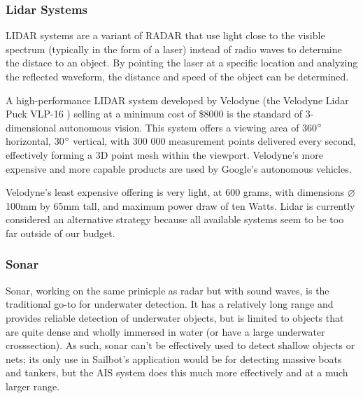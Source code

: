 \subsubsection{\label{sec:intro:alternatives:lidar}Lidar Systems}
LIDAR systems are a variant of RADAR that use light close to the visible spectrum (typically in the form of a laser) instead of radio waves to determine the distace to an object. By pointing the laser at a specific location and analyzing the reflected waveform, the distance and speed of the object can be determined. 

A high-performance LIDAR system developed by Velodyne (the Velodyne Lidar Puck VLP-16 \cite{velodyne-vlp16}) selling at a minimum cost of \$8000 is the standard of 3-dimensional autonomous vision. This system offers a viewing area of 360$\degree$ horizontal, 30$\degree$ vertical, with 300 000 measurement points delivered every second, effectively forming a 3D point mesh within the viewport. Velodyne's more expensive and more capable products are used by Google's autonomous vehicles.

Velodyne's least expensive offering is very light, at 600 grams, with dimensions $\varnothing$100mm by 65mm tall, and maximum power draw of ten Watts. Lidar is currently considered an alternative strategy because all available systems seem to be too far outside of our budget.


\subsubsection{\label{sec:intro:alternatives:sonar}Sonar}
Sonar, working on the same prinicple as radar but with sound waves, is the traditional go-to for underwater detection. It has a relatively long range and provides reliable detection of underwater objects, but is limited to objects that are quite dense and wholly immersed in water (or have a large underwater crosssection). As such, sonar can't be effectively used to detect shallow objects or nets; its only use in Sailbot's application would be for detecting massive boats and tankers, but the AIS system does this much more effectively and at a much larger range.
